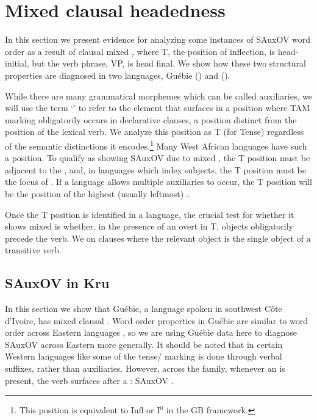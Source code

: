 \documentclass[output=paper,newtxmath,modfonts,nonflat,draftmode]{langsci/langscibook}
\begin{document}
\section{Mixed clausal headedness}\label{sec:strictSAuxOV}

In this section we present evidence for analyzing some instances of SAuxOV word order as a result of clausal mixed , where T, the position of inflection, is head-initial, but the verb phrase, VP, is head final. We show how these two structural properties are diagnosed in two languages, Guébie  () and  ().

While there are many grammatical morphemes which can be called auxiliaries, we will use the term `' to refer to the element that surfaces in a position where TAM marking obligatorily occurs in declarative clauses, a position distinct from the position of the lexical verb. We analyze this position as T (for Tense) regardless of the semantic distinctions it encodes.\footnote{This position is equivalent to Infl or I$^0$ in the GB framework.} Many West African languages have such a position. To qualify as showing SAuxOV due to mixed , the T position must be adjacent to the , and, in languages which index subjects, the T position must be the locus of . If a language allows multiple auxiliaries to occur, the T position will be the position of the highest (usually leftmost) .

Once the T position is identified in a language, the crucial test for whether it shows mixed  is whether, in the presence of an overt  in T, objects obligatorily precede the verb. We  on clauses where the relevant object is the single object of a transitive verb.

\subsection{SAuxOV in Kru}

In this section we show that Guébie, a  language spoken in southwest Côte d'Ivoire, has mixed clausal . Word order properties in Guébie are similar to word order across Eastern  languages \citep[cf.][]{Marchese1979}, so we are using Guébie data here to diagnose SAuxOV across Eastern  more generally. It should be noted that in certain Western  languages like  \citep{Innes:1966} some of the tense/ marking is done through verbal suffixes, rather than auxiliaries. However, across the family, whenever an  is present, the verb surfaces after a : SAuxOV \citep{Marchese1979}.
\end{document}
